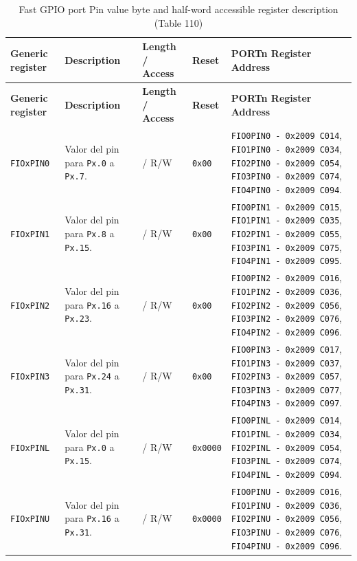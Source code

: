 \begin{longtable}{|>{\raggedright\arraybackslash}p{}|>{\raggedright\arraybackslash}p{}|>{\centering\arraybackslash}p{}|>{\centering\arraybackslash}p{}|>{\raggedright\arraybackslash}p{}|}
\caption{Fast GPIO port Pin value byte and half-word accessible register description (Table 110)} \\
\hline
\textbf{Generic register} & \textbf{Description} & \textbf{Length / Access} & \textbf{Reset} & \textbf{PORTn Register Address} \\
\hline
\endfirsthead
\hline
\textbf{Generic register} & \textbf{Description} & \textbf{Length / Access} & \textbf{Reset} & \textbf{PORTn Register Address} \\
\hline
\endhead
\texttt{FIOxPIN0} & Valor del pin para \texttt{Px.0} a \texttt{Px.7}. & 8 / R/W & \texttt{0x00} & \texttt{FIO0PIN0 - 0x2009 C014}, \texttt{FIO1PIN0 - 0x2009 C034}, \texttt{FIO2PIN0 - 0x2009 C054}, \texttt{FIO3PIN0 - 0x2009 C074}, \texttt{FIO4PIN0 - 0x2009 C094}. \\
\hline
\texttt{FIOxPIN1} & Valor del pin para \texttt{Px.8} a \texttt{Px.15}. & 8 / R/W & \texttt{0x00} & \texttt{FIO0PIN1 - 0x2009 C015}, \texttt{FIO1PIN1 - 0x2009 C035}, \texttt{FIO2PIN1 - 0x2009 C055}, \texttt{FIO3PIN1 - 0x2009 C075}, \texttt{FIO4PIN1 - 0x2009 C095}. \\
\hline
\texttt{FIOxPIN2} & Valor del pin para \texttt{Px.16} a \texttt{Px.23}. & 8 / R/W & \texttt{0x00} & \texttt{FIO0PIN2 - 0x2009 C016}, \texttt{FIO1PIN2 - 0x2009 C036}, \texttt{FIO2PIN2 - 0x2009 C056}, \texttt{FIO3PIN2 - 0x2009 C076}, \texttt{FIO4PIN2 - 0x2009 C096}. \\
\hline
\texttt{FIOxPIN3} & Valor del pin para \texttt{Px.24} a \texttt{Px.31}. & 8 / R/W & \texttt{0x00} & \texttt{FIO0PIN3 - 0x2009 C017}, \texttt{FIO1PIN3 - 0x2009 C037}, \texttt{FIO2PIN3 - 0x2009 C057}, \texttt{FIO3PIN3 - 0x2009 C077}, \texttt{FIO4PIN3 - 0x2009 C097}. \\
\hline
\texttt{FIOxPINL} & Valor del pin para \texttt{Px.0} a \texttt{Px.15}. & 16 / R/W & \texttt{0x0000} & \texttt{FIO0PINL - 0x2009 C014}, \texttt{FIO1PINL - 0x2009 C034}, \texttt{FIO2PINL - 0x2009 C054}, \texttt{FIO3PINL - 0x2009 C074}, \texttt{FIO4PINL - 0x2009 C094}. \\
\hline
\texttt{FIOxPINU} & Valor del pin para \texttt{Px.16} a \texttt{Px.31}. & 16 / R/W & \texttt{0x0000} & \texttt{FIO0PINU - 0x2009 C016}, \texttt{FIO1PINU - 0x2009 C036}, \texttt{FIO2PINU - 0x2009 C056}, \texttt{FIO3PINU - 0x2009 C076}, \texttt{FIO4PINU - 0x2009 C096}. \\
\hline
\end{longtable}

